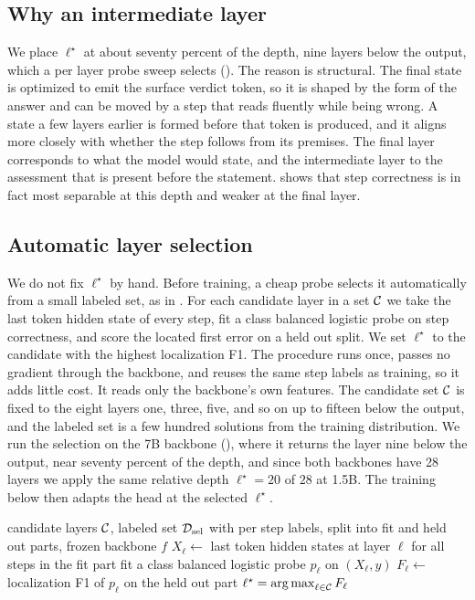 \subsection{Why an intermediate layer}
\label{sec:method-layer}

We place $\ell^\star$ at about seventy percent of the depth, nine layers below the output, which a per layer probe sweep selects (). The reason is structural. The final state is optimized to emit the surface verdict token, so it is shaped by the form of the answer and can be moved by a step that reads fluently while being wrong. A state a few layers earlier is formed before that token is produced, and it aligns more closely with whether the step follows from its premises. The final layer corresponds to what the model would state, and the intermediate layer to the assessment that is present before the statement.  shows that step correctness is in fact most separable at this depth and weaker at the final layer.

\subsection{Automatic layer selection}
\label{sec:method-select}

We do not fix $\ell^\star$ by hand. Before training, a cheap probe selects it automatically from a small labeled set, as in . For each candidate layer in a set $\mathcal{C}$ we take the last token hidden state of every step, fit a class balanced logistic probe on step correctness, and score the located first error on a held out split. We set $\ell^\star$ to the candidate with the highest localization F1. The procedure runs once, passes no gradient through the backbone, and reuses the same step labels as training, so it adds little cost. It reads only the backbone's own features. The candidate set $\mathcal{C}$ is fixed to the eight layers one, three, five, and so on up to fifteen below the output, and the labeled set is a few hundred solutions from the training distribution. We run the selection on the 7B backbone (), where it returns the layer nine below the output, near seventy percent of the depth, and since both backbones have 28 layers we apply the same relative depth $\ell^\star=20$ of $28$ at 1.5B. The training below then adapts the head at the selected $\ell^\star$.

\begin{algorithm}[t]
  \caption{Automatic selection of the intermediate layer $\ell^\star$}
  \label{alg:select}
  \begin{algorithmic}[1]
    \REQUIRE candidate layers $\mathcal{C}$, labeled set $\mathcal{D}_{\mathrm{sel}}$ with per step labels, split into fit and held out parts, frozen backbone $f$
      \STATE $X_\ell \leftarrow$ last token hidden states at layer $\ell$ for all steps in the fit part
      \STATE fit a class balanced logistic probe $p_\ell$ on $(X_\ell, y)$
      \STATE $F_\ell \leftarrow$ localization F1 of $p_\ell$ on the held out part
    \ENDFOR
    \RETURN $\ell^\star = \operatorname*{arg\,max}_{\ell \in \mathcal{C}} F_\ell$
  \end{algorithmic}
\end{algorithm}

